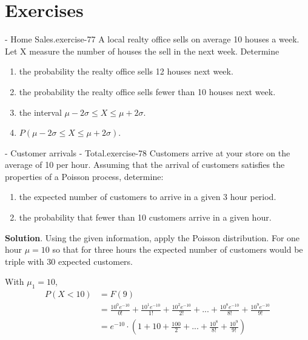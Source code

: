 \documentclass[10pt,]{book}
\numberwithin{equation}{section}
\newcommand{\lt}{<}
\begin{document}
\section[{Exercises}]{Exercises}\label{section-56}
\hypertarget{p-1149}{}%
\begin{inlineexercise}{- Home Sales.}{exercise-77}%
\hypertarget{p-1150}{}%
A local realty office sells on average 10 houses a week.  Let X measure the number of houses the sell in the next week.  Determine \leavevmode%
\begin{enumerate}
\item\hypertarget{li-296}{}the probability the realty office sells 12 houses next week.%
\item\hypertarget{li-297}{}the probability the realty office sells fewer than 10 houses next week.%
\item\hypertarget{li-298}{}the interval \(\mu - 2\sigma \le X \le \mu + 2\sigma\).%
\item\hypertarget{li-299}{}\(P(\mu - 2\sigma \le X \le \mu + 2\sigma)\).%
\end{enumerate}
%
\end{inlineexercise}
%
\par
\hypertarget{p-1151}{}%
\begin{inlineexercise}{- Customer arrivals - Total.}{exercise-78}%
\hypertarget{p-1152}{}%
Customers arrive at your store on the average of 10 per hour.  Assuming that the arrival of customers satisfies the properties of a Poisson process, determine: \leavevmode%
\begin{enumerate}
\item\hypertarget{li-300}{}the expected number of customers to arrive in a given 3 hour period.%
\item\hypertarget{li-301}{}the probability that fewer than 10 customers arrive in a given hour.%
\end{enumerate}
 \textbf{Solution}.\quad%
\hypertarget{p-1153}{}%
Using the given information, apply the Poisson distribution.  For one hour \(\mu = 10\) so that for three hours the expected number of customers would be triple with 30 expected customers.%
\par
\hypertarget{p-1154}{}%
With \(\mu_1 = 10\),%
\begin{align*}
P(X \lt 10) & = F(9)\\
& = \frac{10^0 e^{-10}}{0!} + \frac{10^1 e^{-10}}{1!} + \frac{10^2 e^{-10}}{2!} + ... + \frac{10^8 e^{-10}}{8!} + \frac{10^9 e^{-10}}{9!}\\
& = e^{-10} \cdot ( 1 + 10 + \frac{100}{2} + ... + \frac{10^8}{8!} + \frac{10^9}{9!} )
\end{align*}
%
%
\end{inlineexercise}
\end{document}
